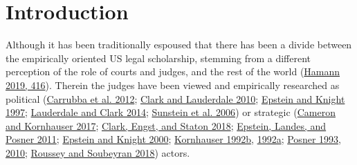 \documentclass[
  11pt,
]{article}
\begin{document}
\vskip -8.5pt

{
\hypersetup{linkcolor=black}
\setcounter{tocdepth}{2}
\tableofcontents
}


{
\setcounter{tocdepth}{2}
\tableofcontents
}

\setlength{\parindent}{16pt}
\setlength{\parskip}{0pt}

\hypertarget{introduction}{%
\section{Introduction}\label{introduction}}

Although it has been traditionally espoused that there has been a divide
between the empirically oriented US legal scholarship, stemming from a
different perception of the role of courts and judges, and the rest of
the world (\protect\hyperlink{ref-hamannGermanFederalCourts2019}{Hamann
2019, 416}). Therein the judges have been viewed and empirically
researched as political
(\protect\hyperlink{ref-carrubbaWhoControlsContent2012}{Carrubba et al.
2012}; \protect\hyperlink{ref-clarkLocatingSupremeCourt2010}{Clark and
Lauderdale 2010};
\protect\hyperlink{ref-epsteinChoicesJusticesMake1997}{Epstein and
Knight 1997};
\protect\hyperlink{ref-lauderdaleScalingPoliticallyMeaningful2014}{Lauderdale
and Clark 2014};
\protect\hyperlink{ref-sunsteinAreJudgesPolitical2006}{Sunstein et al.
2006}) or strategic
(\protect\hyperlink{ref-cameronChapterWhatJudges2017}{Cameron and
Kornhauser 2017};
\protect\hyperlink{ref-clarkEstimatingEffectLeisure2018}{Clark, Engst,
and Staton 2018};
\protect\hyperlink{ref-epsteinWhyWhenJudges2011}{Epstein, Landes, and
Posner 2011};
\protect\hyperlink{ref-epsteinStrategicRevolutionJudicial2000}{Epstein
and Knight 2000};
\protect\hyperlink{ref-kornhauserModelingCollegialCourts1992}{Kornhauser
1992b},
\protect\hyperlink{ref-kornhauserModelingCollegialCourts1992a}{1992a};
\protect\hyperlink{ref-posnerWhatJudgesJustices1993}{Posner 1993},
\protect\hyperlink{ref-posnerHowJudgesThink2010}{2010};
\protect\hyperlink{ref-rousseyOverburdenedJudges2018}{Roussey and
Soubeyran 2018}) actors.
\end{document}
